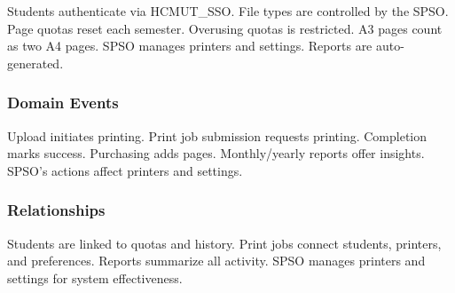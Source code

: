 Students authenticate via HCMUT\_SSO. File types are controlled by the SPSO. Page quotas reset each semester. Overusing quotas is restricted. A3 pages count as two A4 pages. SPSO manages printers and settings. Reports are auto-generated.

\subsubsection{Domain Events}

Upload initiates printing. Print job submission requests printing. Completion marks success. Purchasing adds pages. Monthly/yearly reports offer insights. SPSO's actions affect printers and settings.

\subsubsection{Relationships}

Students are linked to quotas and history. Print jobs connect students, printers, and preferences. Reports summarize all activity. SPSO manages printers and settings for system effectiveness.


